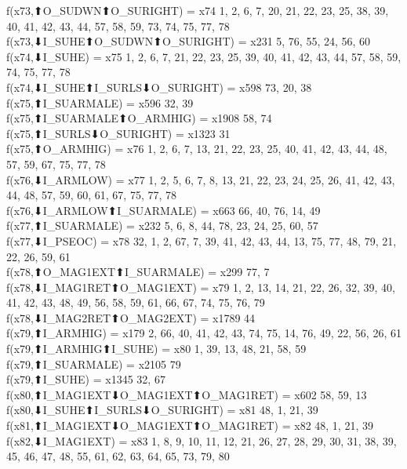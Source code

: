 f(x73,⬆O_SUDWN⬆O_SURIGHT) = x74 {1, 2, 6, 7, 20, 21, 22, 23, 25, 38, 39, 40, 41, 42, 43, 44, 57, 58, 59, 73, 74, 75, 77, 78} \\
f(x73,⬇I_SUHE⬆O_SUDWN⬆O_SURIGHT) = x231 {5, 76, 55, 24, 56, 60} \\
f(x74,⬇I_SUHE) = x75 {1, 2, 6, 7, 21, 22, 23, 25, 39, 40, 41, 42, 43, 44, 57, 58, 59, 74, 75, 77, 78} \\
f(x74,⬇I_SUHE⬆I_SURLS⬇O_SURIGHT) = x598 {73, 20, 38} \\
f(x75,⬆I_SUARMALE) = x596 {32, 39} \\
f(x75,⬆I_SUARMALE⬆O_ARMHIG) = x1908 {58, 74} \\
f(x75,⬆I_SURLS⬇O_SURIGHT) = x1323 {31} \\
f(x75,⬆O_ARMHIG) = x76 {1, 2, 6, 7, 13, 21, 22, 23, 25, 40, 41, 42, 43, 44, 48, 57, 59, 67, 75, 77, 78} \\
f(x76,⬇I_ARMLOW) = x77 {1, 2, 5, 6, 7, 8, 13, 21, 22, 23, 24, 25, 26, 41, 42, 43, 44, 48, 57, 59, 60, 61, 67, 75, 77, 78} \\
f(x76,⬇I_ARMLOW⬆I_SUARMALE) = x663 {66, 40, 76, 14, 49} \\
f(x77,⬆I_SUARMALE) = x232 {5, 6, 8, 44, 78, 23, 24, 25, 60, 57} \\
f(x77,⬇I_PSEOC) = x78 {32, 1, 2, 67, 7, 39, 41, 42, 43, 44, 13, 75, 77, 48, 79, 21, 22, 26, 59, 61} \\
f(x78,⬆O_MAG1EXT⬆I_SUARMALE) = x299 {77, 7} \\
f(x78,⬇I_MAG1RET⬆O_MAG1EXT) = x79 {1, 2, 13, 14, 21, 22, 26, 32, 39, 40, 41, 42, 43, 48, 49, 56, 58, 59, 61, 66, 67, 74, 75, 76, 79} \\
f(x78,⬇I_MAG2RET⬆O_MAG2EXT) = x1789 {44} \\
f(x79,⬆I_ARMHIG) = x179 {2, 66, 40, 41, 42, 43, 74, 75, 14, 76, 49, 22, 56, 26, 61} \\
f(x79,⬆I_ARMHIG⬆I_SUHE) = x80 {1, 39, 13, 48, 21, 58, 59} \\
f(x79,⬆I_SUARMALE) = x2105 {79} \\
f(x79,⬆I_SUHE) = x1345 {32, 67} \\
f(x80,⬆I_MAG1EXT⬇O_MAG1EXT⬆O_MAG1RET) = x602 {58, 59, 13} \\
f(x80,⬇I_SUHE⬆I_SURLS⬇O_SURIGHT) = x81 {48, 1, 21, 39} \\
f(x81,⬆I_MAG1EXT⬇O_MAG1EXT⬆O_MAG1RET) = x82 {48, 1, 21, 39} \\
f(x82,⬇I_MAG1EXT) = x83 {1, 8, 9, 10, 11, 12, 21, 26, 27, 28, 29, 30, 31, 38, 39, 45, 46, 47, 48, 55, 61, 62, 63, 64, 65, 73, 79, 80} \\

